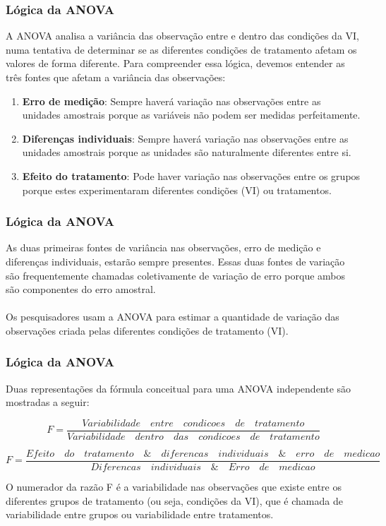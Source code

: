 \documentclass[11pt]{beamer}
\begin{document}
\begin{frame}
\frametitle{Lógica da ANOVA}
A ANOVA analisa a variância das observação entre e dentro das condições da VI, numa tentativa de determinar se as diferentes condições de tratamento afetam os valores de forma diferente. Para compreender essa lógica, devemos entender as três fontes que afetam a variância das observações:

\begin{enumerate}
\item \textbf{Erro de medição}: Sempre haverá variação nas observações entre as unidades amostrais porque as variáveis não podem ser medidas perfeitamente.
\item \textbf{Diferenças individuais}: Sempre haverá variação nas observações entre as unidades amostrais porque as unidades são naturalmente diferentes entre si.
\item \textbf{Efeito do tratamento}: Pode haver variação nas observações entre os grupos porque estes experimentaram diferentes condições (VI) ou tratamentos.
\end{enumerate}
\end{frame}

\begin{frame}
\frametitle{Lógica da ANOVA}
As duas primeiras fontes de variância nas observações, erro de medição e diferenças individuais, estarão sempre presentes. Essas duas fontes de variação são frequentemente chamadas coletivamente de variação de erro porque ambos são componentes do erro amostral.\\~\\

Os pesquisadores usam a ANOVA para estimar a quantidade de variação das observações criada pelas diferentes condições de tratamento (VI).
\end{frame}

\begin{frame}
\frametitle{Lógica da ANOVA}
Duas representações da fórmula conceitual para uma ANOVA independente são mostradas a seguir:
 
\[F = \frac{Variabilidade\quad entre\quad condicoes\quad de\quad tratamento}{Variabilidade\quad dentro\quad das\quad condicoes\quad de\quad tratamento}\]
 
\[F = \frac{Efeito\quad do\quad tratamento\quad \&\quad diferencas\quad individuais\quad \&\quad erro\quad de\quad medicao}{Diferencas\quad individuais\quad \&\quad Erro\quad de\quad medicao}\]

O numerador da razão F é a variabilidade nas observações que existe entre os diferentes grupos de tratamento (ou seja, condições da VI), que é chamada de variabilidade entre grupos ou variabilidade entre tratamentos.
\end{frame}
\end{document}
